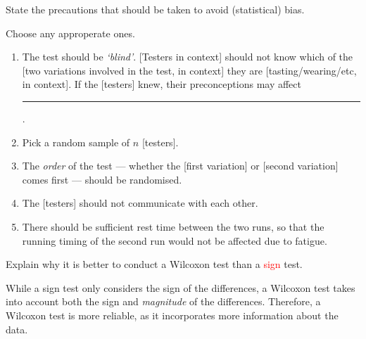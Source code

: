 \documentclass[../Notes.tex]{subfiles}
\begin{document}
\begin{note}
  State the precautions that should be taken to avoid (statistical) bias. 
  \begin{center}
    \parbox{0.9\textwidth}{
      Choose any approperate ones.
      \begin{enumerate}
        \item The test should be \emph{`blind'}. [Testers in context] should not know which of the [two variations involved in the test, in context] they are [tasting/wearing/etc, in context]. If the [testers] knew, their preconceptions may affect \rule{2cm}{0.01mm}.
        \item Pick a random sample of \(n\) [testers].
        \item The \emph{order} of the test --- whether the [first variation] or [second variation] comes first --- should be randomised.
        \item The [testers] should not communicate with each other.
        \item There should be sufficient rest time between the two runs, so that the running timing of the second run would not be affected due to fatigue.
      \end{enumerate}
    }
  \end{center}
\end{note}
\begin{note}
  Explain why it is better to conduct a \textcolor{green!70!black}{Wilcoxon} test than a \textcolor{red}{sign} test.
  \begin{center}
    \parbox{0.9\textwidth}{
     While a sign test only considers the sign of the differences, a Wilcoxon test takes into account both the sign and \emph{magnitude} of the differences. Therefore, a Wilcoxon test is more reliable, as it incorporates more information about the data.
    }
  \end{center}
      
\end{note}
      
\end{document}

